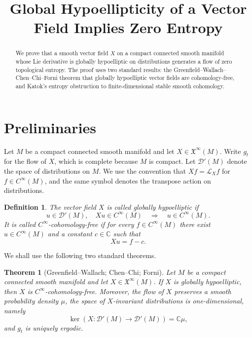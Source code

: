 \documentclass[11pt]{article}
\newtheorem{theorem}{Theorem}
\newtheorem{definition}{Definition}
\newcommand{\Lie}{\mathcal L}
\newcommand{\D}{\mathcal D}
\newcommand{\C}{\mathbb C}
\begin{document}
\title{Global Hypoellipticity of a Vector Field Implies Zero Entropy}
\author{}
\date{}
\maketitle

\begin{abstract}
We prove that a smooth vector field \(X\) on a compact connected smooth
manifold whose Lie derivative is globally hypoelliptic on distributions
generates a flow of zero topological entropy.  The proof uses two standard
results: the Greenfield--Wallach--Chen--Chi--Forni theorem that globally
hypoelliptic vector fields are cohomology-free, and Katok's entropy obstruction
to finite-dimensional stable smooth cohomology.
\end{abstract}

\section{Preliminaries}

Let \(M\) be a compact connected smooth manifold and let \(X\in \mathfrak X^\infty(M)\).
Write \(g_t\) for the flow of \(X\), which is complete because \(M\) is compact.
Let \(\D'(M)\) denote the space of distributions on \(M\).  We use the convention
that \(Xf=\Lie_X f\) for \(f\in C^\infty(M)\), and the same symbol denotes the
transpose action on distributions.

\begin{definition}
The vector field \(X\) is called \emph{globally hypoelliptic} if
\[
        u\in \D'(M),\quad Xu\in C^\infty(M)
        \quad\Longrightarrow\quad
        u\in C^\infty(M).
\]
It is called \emph{\(C^\infty\)-cohomology-free} if for every
\(f\in C^\infty(M)\) there exist \(u\in C^\infty(M)\) and a constant \(c\in\C\)
such that
\[
        Xu=f-c .
\]
\end{definition}

We shall use the following two standard theorems.

\begin{theorem}[Greenfield--Wallach; Chen--Chi; Forni]
\label{thm:GH_CF}
Let \(M\) be a compact connected smooth manifold and let \(X\in\mathfrak X^\infty(M)\).
If \(X\) is globally hypoelliptic, then \(X\) is \(C^\infty\)-cohomology-free.
Moreover, the flow of \(X\) preserves a smooth probability density \(\mu\), the
space of \(X\)-invariant distributions is one-dimensional, namely
\[
        \ker(X:\D'(M)\to\D'(M))=\C\mu,
\]
and \(g_t\) is uniquely ergodic.
\end{theorem}
\end{document}
